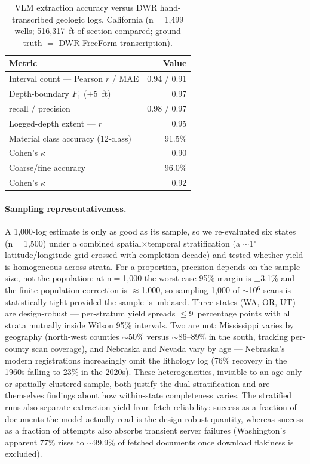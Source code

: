 \documentclass[12pt]{article}
\begin{document}
\begin{table}[t]\centering\small
\caption{VLM extraction accuracy versus DWR hand-transcribed geologic logs, California
(n$=$1{,}499 wells; 516{,}317~ft of section compared; ground truth $=$ DWR FreeForm transcription).}
\label{tab:accuracy}
\begin{tabular}{l r}
\toprule
Metric & Value \\
\midrule
Interval count --- Pearson $r$ / MAE & 0.94 / 0.91 \\
Depth-boundary $F_1$ ($\pm$5~ft) & 0.97 \\
\quad recall / precision & 0.98 / 0.97 \\
Logged-depth extent --- $r$ & 0.95 \\
Material class accuracy (12-class) & 91.5\% \\
\quad Cohen's $\kappa$ & 0.90 \\
Coarse/fine accuracy & 96.0\% \\
\quad Cohen's $\kappa$ & 0.92 \\
\bottomrule
\end{tabular}
\end{table}

\paragraph{Sampling representativeness.} A 1{,}000-log estimate is only as good as its sample, so we
re-evaluated six states (n$=$1{,}500) under a combined spatial$\times$temporal stratification (a
$\sim$1$^{\circ}$ latitude/longitude grid crossed with completion decade) and tested whether yield is
homogeneous across strata. For a proportion, precision depends on the sample size, not the population: at
n$=$1{,}000 the worst-case 95\% margin is $\pm$3.1\% and the finite-population correction is $\approx$1.000,
so sampling 1{,}000 of $\sim$10$^6$ scans is statistically tight provided the sample is unbiased.
Three states (WA, OR, UT) are design-robust --- per-stratum yield spreads $\le$9~percentage points with all
strata mutually inside Wilson 95\% intervals. Two are not: Mississippi varies by geography
(north-west counties $\sim$50\% versus $\sim$86--89\% in the south, tracking per-county scan coverage), and
Nebraska and Nevada vary by age --- Nebraska's modern registrations increasingly omit the lithology
log (76\% recovery in the 1960s falling to 23\% in the 2020s). These heterogeneities, invisible to an
age-only or spatially-clustered sample, both justify the dual stratification and are themselves findings
about how within-state completeness varies. The stratified runs also separate extraction yield from
fetch reliability: success as a fraction of documents the model actually read is the design-robust
quantity, whereas success as a fraction of attempts also absorbs transient server failures (Washington's
apparent 77\% rises to $\sim$99.9\% of fetched documents once download flakiness is excluded).
\end{document}
